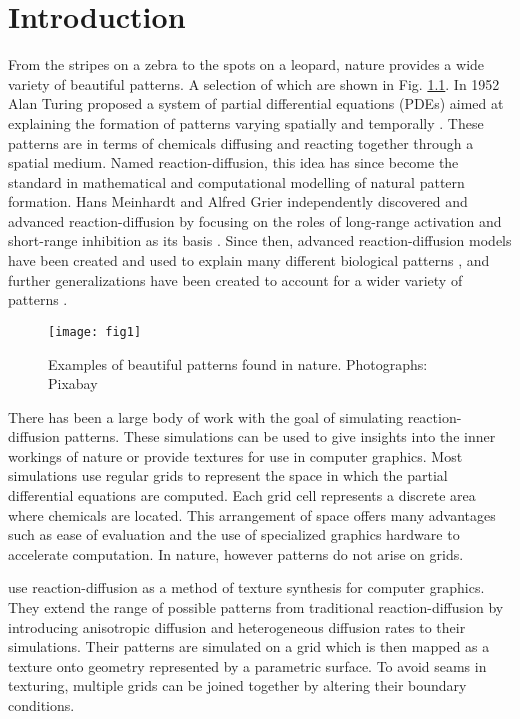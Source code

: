 \chapter{Introduction}
From the stripes on a zebra to the spots on a leopard, nature provides a wide variety of beautiful patterns. A selection of which are shown in Fig. \ref{fig:naturalPatterns1}. In 1952 Alan Turing proposed a system of partial differential equations (PDEs) aimed at explaining the formation of patterns varying spatially and temporally \citep{Turing1952}. These patterns are in terms of chemicals diffusing and reacting together through a spatial medium. Named reaction-diffusion, this idea has since become the standard in mathematical and computational modelling of natural pattern formation. Hans Meinhardt and Alfred Grier independently discovered and advanced reaction-diffusion by focusing on the roles of long-range activation and short-range inhibition as its basis \citep{Gierer1972}. Since then, advanced reaction-diffusion models have been created and used to explain many different biological patterns \citep{GarzonAlvarado2011, fowler1992modeling, lefevre2010reaction}, and further generalizations have been created to account for a wider variety of patterns \citep{KONDO2017120}.

\begin{figure}[H]
  \centering
  \texttt{[image: fig1]}
  \caption{Examples of beautiful patterns found in nature. \textcolor{citation-gray}{Photographs: Pixabay}}
  \label{fig:naturalPatterns1}
\end{figure}

There has been a large body of work with the goal of simulating reaction-diffusion patterns. These simulations can be used to give insights into the inner workings of nature or provide textures for use in computer graphics. Most simulations use regular grids to represent the space in which the partial differential equations are computed. Each grid cell represents a discrete area where chemicals are located. This arrangement of space offers many advantages such as ease of evaluation and the use of specialized graphics hardware to accelerate computation. In nature, however patterns do not arise on grids. 

\citet{Witkin1991} use reaction-diffusion as a method of texture synthesis for computer graphics. They extend the range of possible patterns from traditional reaction-diffusion by introducing anisotropic diffusion and heterogeneous diffusion rates to their simulations. Their patterns are simulated on a grid which is then mapped as a texture onto geometry represented by a parametric surface.  To avoid seams in texturing, multiple grids can be joined together by altering their boundary conditions. 

